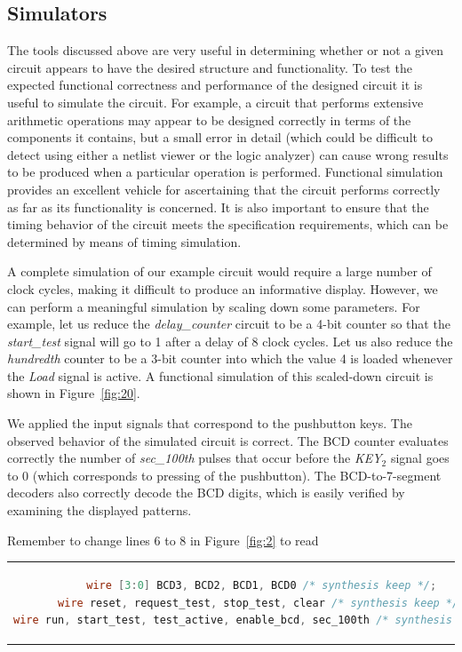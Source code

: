 \documentclass[11pt, twoside, pdftex]{article}
\begin{document}
\subsection{Simulators}
The tools discussed above are very useful in determining whether or not a
given circuit appears to have the desired structure and functionality.
To test the expected functional correctness and performance of the designed
circuit it is useful to simulate the circuit. For example, a circuit that
performs extensive arithmetic operations may appear to be designed correctly
in terms of the components it contains, but a small error in detail (which 
could be difficult to detect using either a netlist viewer or the logic analyzer)
can cause wrong results to be produced when a particular operation is performed.
Functional simulation provides an excellent vehicle for ascertaining that the
circuit performs correctly as far as its functionality is concerned. It is
also important to ensure that the timing behavior of the circuit meets the
specification requirements, which can be determined by means of timing simulation.

A complete simulation of our example circuit would require a large number of
clock cycles, making it difficult to produce an informative display.
However, we can perform a meaningful simulation by scaling down 
some parameters. For example, let us reduce the {\it delay\_counter} circuit
to be a 4-bit counter so that the {\it start\_test} signal will go to 1 after
a delay of 8 clock cycles. Let us also reduce the {\it hundredth} counter
to be a 3-bit counter into which the value 4 is loaded whenever the {\it Load}
signal is active. A functional simulation of this scaled-down circuit is
shown in Figure~\ref{fig:20}.

We applied the input signals that correspond to the pushbutton keys. The observed
behavior of the simulated circuit is correct. The BCD counter evaluates correctly
the number of {\it sec\_100th} pulses that occur before the {\it KEY}$_2$
signal goes to 0 (which corresponds to pressing of the pushbutton).
The BCD-to-7-segment decoders also correctly decode the BCD digits, which
is easily verified by examining the displayed patterns.

Remember to change lines 6 to 8 in Figure~\ref{fig:2} to read

\begin{center}
\begin{tabular}{c}
\begin{lstlisting}[language=Verilog]
wire [3:0] BCD3, BCD2, BCD1, BCD0 /* synthesis keep */;
wire reset, request_test, stop_test, clear /* synthesis keep */;
wire run, start_test, test_active, enable_bcd, sec_100th /* synthesis keep */;
\end{lstlisting}
\end{tabular}
\end{center}
\end{document}
